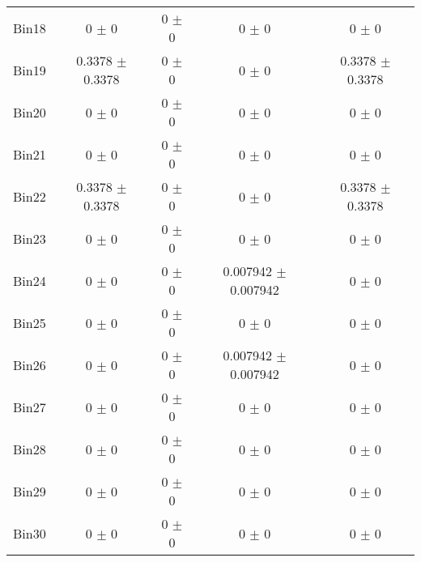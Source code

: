\begin{tabular}{@{\extracolsep{4pt}}lcccc@{}}
     Bin18 & 0 $\pm$ 0 & 0 $\pm$ 0 & 0 $\pm$ 0 & 0 $\pm$ 0 \\ 
     Bin19 & 0.3378 $\pm$ 0.3378 & 0 $\pm$ 0 & 0 $\pm$ 0 & 0.3378 $\pm$ 0.3378 \\ 
     Bin20 & 0 $\pm$ 0 & 0 $\pm$ 0 & 0 $\pm$ 0 & 0 $\pm$ 0 \\ 
     Bin21 & 0 $\pm$ 0 & 0 $\pm$ 0 & 0 $\pm$ 0 & 0 $\pm$ 0 \\ 
     Bin22 & 0.3378 $\pm$ 0.3378 & 0 $\pm$ 0 & 0 $\pm$ 0 & 0.3378 $\pm$ 0.3378 \\ 
     Bin23 & 0 $\pm$ 0 & 0 $\pm$ 0 & 0 $\pm$ 0 & 0 $\pm$ 0 \\ 
     Bin24 & 0 $\pm$ 0 & 0 $\pm$ 0 & 0.007942 $\pm$ 0.007942 & 0 $\pm$ 0 \\ 
     Bin25 & 0 $\pm$ 0 & 0 $\pm$ 0 & 0 $\pm$ 0 & 0 $\pm$ 0 \\ 
     Bin26 & 0 $\pm$ 0 & 0 $\pm$ 0 & 0.007942 $\pm$ 0.007942 & 0 $\pm$ 0 \\ 
     Bin27 & 0 $\pm$ 0 & 0 $\pm$ 0 & 0 $\pm$ 0 & 0 $\pm$ 0 \\ 
     Bin28 & 0 $\pm$ 0 & 0 $\pm$ 0 & 0 $\pm$ 0 & 0 $\pm$ 0 \\ 
     Bin29 & 0 $\pm$ 0 & 0 $\pm$ 0 & 0 $\pm$ 0 & 0 $\pm$ 0 \\ 
     Bin30 & 0 $\pm$ 0 & 0 $\pm$ 0 & 0 $\pm$ 0 & 0 $\pm$ 0 \\ 
\hline\hline
  \end{tabular}

